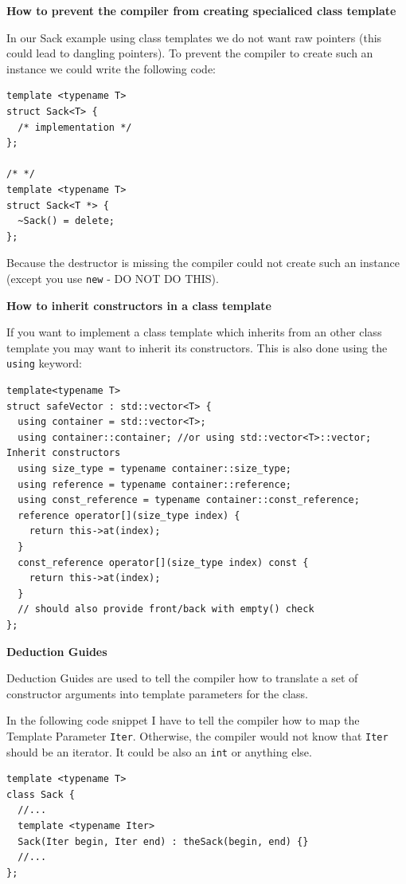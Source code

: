 \documentclass[11pt,twoside,landscape]{article}
\begin{document}
\begin{multicols}{3}
\textbf{How to prevent the compiler from creating specialiced class template}

In our Sack example using class templates we do not want raw pointers (this could lead to dangling pointers).
To prevent the compiler to create such an instance we could write the following code:

\lstset{language=c++,label= ,caption= ,captionpos=b,numbers=none}
\begin{lstlisting}
template <typename T>
struct Sack<T> {
  /* implementation */
};

/* */
template <typename T>
struct Sack<T *> {
  ~Sack() = delete;
};
\end{lstlisting}

Because the destructor is missing the compiler could not create such an instance (except you use \texttt{new} - DO NOT DO THIS).

\textbf{How to inherit constructors in a class template}

If you want to implement a class template which inherits from an other class template you may want to inherit its constructors.
This is also done using the \texttt{using} keyword:

\lstset{language=c++,label= ,caption= ,captionpos=b,numbers=none}
\begin{lstlisting}
template<typename T>
struct safeVector : std::vector<T> {
  using container = std::vector<T>;
  using container::container; //or using std::vector<T>::vector; Inherit constructors
  using size_type = typename container::size_type;
  using reference = typename container::reference;
  using const_reference = typename container::const_reference;
  reference operator[](size_type index) {
    return this->at(index);
  }
  const_reference operator[](size_type index) const {
    return this->at(index);
  }
  // should also provide front/back with empty() check
};
\end{lstlisting}

\textbf{Deduction Guides}

Deduction Guides are used to tell the compiler how to translate a set of constructor arguments into template parameters for the class.

In the following code snippet I have to tell the compiler how to map the Template Parameter \texttt{Iter}.
Otherwise, the compiler would not know that \texttt{Iter} should be an iterator.
It could be also an \texttt{int} or anything else.


\lstset{language=c++,label= ,caption= ,captionpos=b,numbers=none}
\begin{lstlisting}
template <typename T>
class Sack {
  //...
  template <typename Iter>
  Sack(Iter begin, Iter end) : theSack(begin, end) {}
  //...
};


\end{lstlisting}
\end{multicols}
\end{document}
